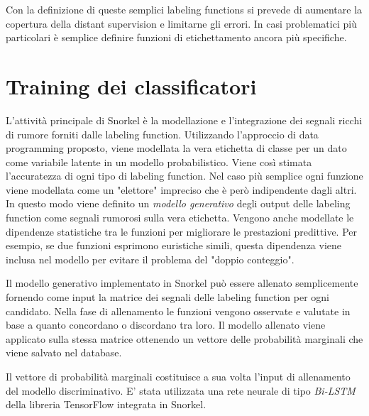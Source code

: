 Con la definizione di queste semplici labeling functions si prevede di aumentare la copertura della distant supervision e limitarne gli errori. In casi problematici più particolari è semplice definire funzioni di etichettamento ancora più specifiche.


\section{Training dei classificatori}
\label{sec:methods:training}

L'attività principale di Snorkel è la modellazione e l'integrazione
dei segnali ricchi di rumore forniti dalle labeling function.
Utilizzando l'approccio di data programming proposto, viene modellata la vera etichetta di classe per un dato come variabile latente in un modello probabilistico. Viene così stimata l'accuratezza di ogni tipo di labeling function.
Nel caso più semplice ogni funzione viene modellata come un "elettore" impreciso che è però indipendente dagli altri. In questo modo viene definito un \textit{modello generativo} degli output delle labeling function come segnali rumorosi sulla vera etichetta. Vengono anche modellate le dipendenze statistiche tra le funzioni per migliorare le prestazioni predittive. Per esempio, se due funzioni esprimono euristiche simili, questa dipendenza viene inclusa nel modello per evitare il problema del "doppio conteggio".

Il modello generativo implementato in Snorkel può essere allenato semplicemente fornendo come input la matrice dei segnali delle labeling function per ogni candidato. Nella fase di allenamento le funzioni vengono osservate e valutate in base a quanto concordano o discordano tra loro. Il modello allenato viene applicato sulla stessa matrice ottenendo un vettore delle probabilità marginali che viene salvato nel database.

Il vettore di probabilità marginali costituisce a sua volta l'input di allenamento del modello discriminativo. E' stata utilizzata una rete neurale di tipo \textit{Bi-LSTM} della libreria TensorFlow integrata in Snorkel. 

